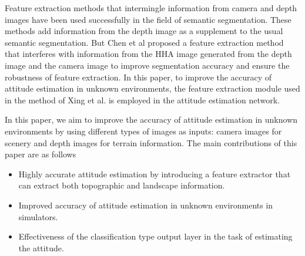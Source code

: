 Feature extraction methods that intermingle information from camera and depth images have been used successfully in the field of semantic segmentation\cite{DBLP:journals/corr/abs-2011-06961}. These methods add information from the depth image as a supplement to the usual semantic segmentation. But Chen et al proposed a feature extraction method\cite{SAGATE} that interferes with information from the HHA image generated from the depth image and the camera image to improve segmentation accuracy and ensure the robustness of feature extraction. In this paper, to improve the accuracy of attitude estimation in unknown environments, the feature extraction module used in the method of Xing et al. is employed in the attitude estimation network. \par



In this paper, we aim to improve the accuracy of attitude estimation in unknown environments by using different types of images as inputs: camera images for scenery and depth images for terrain information. The main contributions of this paper are as follows


\begin{itemize}
\item Highly accurate attitude estimation by introducing a feature extractor that can extract both topographic and landscape information.
\item Improved accuracy of attitude estimation in unknown environments in simulators.
\item Effectiveness of the classification type output layer in the task of estimating the attitude.
\end{itemize}